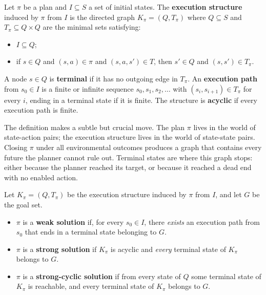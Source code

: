 \begin{definition}
\label{def:execution-structure}
Let $\pi$ be a plan and $I\subseteq S$ a set of initial states.  The
\textbf{execution structure} induced by $\pi$ from $I$ is the directed
graph $K_\pi=(Q,T_\pi)$ where $Q\subseteq S$ and $T_\pi\subseteq
Q\times Q$ are the minimal sets satisfying:
\begin{itemize}[nosep]
  \item $I\subseteq Q$;
  \item if $s\in Q$ and $(s,a)\in\pi$ and $(s,a,s')\in T$, then
        $s'\in Q$ and $(s,s')\in T_\pi$.
\end{itemize}
A node $s\in Q$ is \textbf{terminal} if it has no outgoing edge in
$T_\pi$.  An \textbf{execution path} from $s_0\in I$ is a finite or
infinite sequence $s_0,s_1,s_2,\ldots$ with $(s_i,s_{i+1})\in T_\pi$
for every $i$, ending in a terminal state if it is finite.  The
structure is \textbf{acyclic} if every execution path is finite.
\end{definition}

The definition makes a subtle but crucial move.  The plan $\pi$ lives
in the world of state-action pairs; the execution structure lives in
the world of state-state pairs.  Closing $\pi$ under all environmental
outcomes produces a graph that contains every future the planner cannot
rule out.  Terminal states are where this graph stops: either because
the planner reached its target, or because it reached a dead end with
no enabled action.

\begin{definition}
\label{def:weak-strong-plan}
\label{def:strong-cyclic-plan}
Let $K_\pi=(Q,T_\pi)$ be the execution structure induced by $\pi$ from
$I$, and let $G$ be the goal set.
\begin{itemize}[nosep]
  \item $\pi$ is a \textbf{weak solution} if, for every $s_0\in I$,
        there \emph{exists} an execution path from $s_0$ that ends in a
        terminal state belonging to $G$.
  \item $\pi$ is a \textbf{strong solution} if $K_\pi$ is acyclic and
        \emph{every} terminal state of $K_\pi$ belongs to $G$.
  \item $\pi$ is a \textbf{strong-cyclic solution} if from every state
        of $Q$ some terminal state of $K_\pi$ is reachable, and every
        terminal state of $K_\pi$ belongs to $G$.
\end{itemize}
\end{definition}

